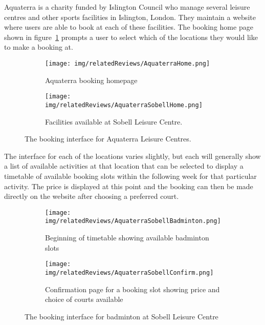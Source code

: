 Aquaterra is a charity funded by Islington Council who manage several leisure
centres and other sports facilities in Islington, London. They maintain a
website\cite{AquaterraLeisure} where users are able to book at each of these
facilities. The booking home page shown in figure~\ref{fig:AquaterraHome}
prompts a user to select which of the locations they would like to make a
booking at.
\begin{figure}[htbp]
	\centering
	\begin{subfigure}[b]{0.3\textwidth}
		\texttt{[image: img/relatedReviews/AquaterraHome.png]}
		\caption{Aquaterra booking homepage}\label{fig:AquaterraHome}
	\end{subfigure}
	\qquad
	\begin{subfigure}[b]{0.3\textwidth}
		\texttt{[image: img/relatedReviews/AquaterraSobellHome.png]}
		\caption{Facilities available at Sobell Leisure Centre.
		}\label{fig:AquaterraSobellHome}
	\end{subfigure}
	\qquad
	\caption{The booking interface for Aquaterra Leisure Centres.
	}\label{fig:AquaterraHomeMain}
\end{figure}

The interface for each of the locations varies slightly, but each will
generally show a list of available activities at that location that can be
selected to display a timetable of available booking slots within the following
week for that particular activity. The price is displayed at this point and the
booking can then be made directly on the website after choosing a preferred
court.
\begin{figure}[htbp]
	\centering
	\begin{subfigure}[b]{0.4\textwidth}
		\texttt{[image: img/relatedReviews/AquaterraSobellBadminton.png]}
		\caption{Beginning of timetable showing available badminton
		slots}\label{fig:AquaterraSobellBadminton}
	\end{subfigure}
	\qquad
	\begin{subfigure}[b]{0.4\textwidth}
		\texttt{[image: img/relatedReviews/AquaterraSobellConfirm.png]}
		\caption{Confirmation page for a booking slot showing price and choice
		of courts available}\label{fig:AquaterraSobellConfirm}
	\end{subfigure}
	\qquad
	\caption{The booking interface for badminton at Sobell Leisure
	Centre}\label{fig:AquaterraSobellBadmintonMain}
\end{figure}

